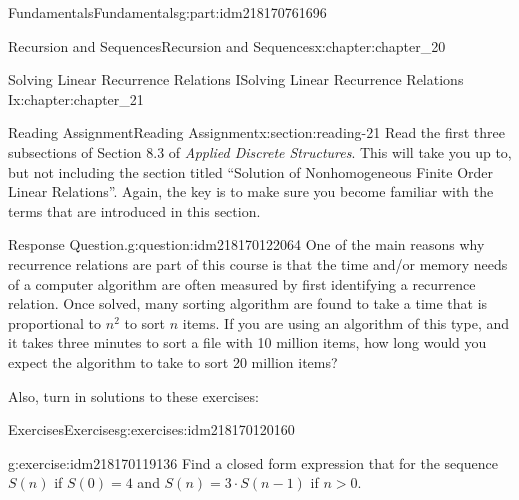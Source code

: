 \documentclass[oneside,10pt,]{book}
\numberwithin{equation}{section}
\newenvironment{codedisplay}
{\VerbatimEnvironment\begin{center}\begin{lrbox}{\codedisplaybox}\begin{BVerbatim}}
{\end{BVerbatim}\end{lrbox}\usebox{\codedisplaybox}\end{center}}
\newcommand{\gt}{>}
\begin{document}
\begin{partptx}{Fundamentals}{}{Fundamentals}{}{}{g:part:idm218170761696}
\begin{chapterptx}{Recursion and Sequences}{}{Recursion and Sequences}{}{}{x:chapter:chapter_20}
\end{chapterptx}
%
\typeout{************************************************}
\typeout{************************************************}
%
\begin{chapterptx}{Solving Linear Recurrence Relations I}{}{Solving Linear Recurrence Relations I}{}{}{x:chapter:chapter_21}
%
%
%
\typeout{************************************************}
\typeout{************************************************}
%
\begin{sectionptx}{Reading Assignment}{}{Reading Assignment}{}{}{x:section:reading-21}
Read the first three subsections of Section 8.3 of \emph{Applied Discrete Structures}.  This will take you up to, but not including the section titled ``Solution of Nonhomogeneous Finite Order Linear Relations''.   Again, the key is to make sure you become familiar with the terms that are introduced in this section.%
\begin{question}{Response Question.}{g:question:idm218170122064}%
One of the main reasons why recurrence relations are part of this course is that the time and\slash{}or memory needs of a computer algorithm are often measured by first identifying a recurrence relation.  Once solved, many sorting algorithm are found to take a time that is proportional to \(n^2\) to sort \(n\) items.  If you are using an algorithm of this type, and it takes three minutes to sort a file with 10 million items, how long would you expect the algorithm to take to sort 20 million items?%
\end{question}
Also, turn in solutions to these exercises:%
%
%
\typeout{************************************************}
\typeout{************************************************}
%
\begin{exercises-subsection-numberless}{Exercises}{}{Exercises}{}{}{g:exercises:idm218170120160}
\par\medskip\noindent%
%
\begin{exercisegroup}
\begin{divisionexerciseeg}{1}{}{}{g:exercise:idm218170119136}%
Find a closed form expression that for the sequence \(S(n)\) if  \(S(0)=4\) and \(S(n)=3 \cdot S(n-1)\) if \(n \gt 0\).%
\end{divisionexerciseeg}%

\end{exercisegroup}
\end{exercises-subsection-numberless}
\end{sectionptx}
\end{chapterptx}
\end{partptx}
\end{document}
